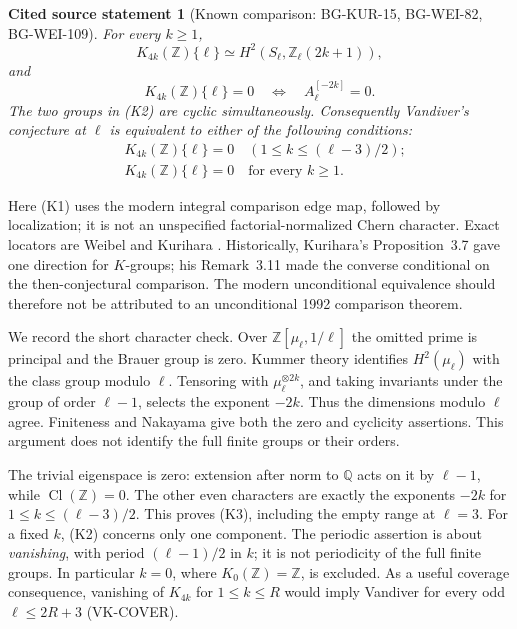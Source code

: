 \documentclass[11pt,a4paper]{article}
\newtheorem{sourcefact}[theorem]{Cited source statement}
\theoremstyle{definition}
\begin{document}
\begin{sourcefact}[Known comparison: BG-KUR-15, BG-WEI-82, BG-WEI-109]
For every \(k\ge1\),
\[
 K_{4k}(\mathbb Z)\{\ell\}
 \simeq H^2(S_\ell,\mathbb Z_\ell(2k+1)),                 \tag{K1}
\]
and
\[
 K_{4k}(\mathbb Z)\{\ell\}=0
 \quad\Longleftrightarrow\quad A_\ell^{[-2k]}=0.         \tag{K2}
\]
The two groups in (K2) are cyclic simultaneously.
Consequently Vandiver's conjecture at \(\ell\) is equivalent to either
of the following conditions:
\[
\begin{split}
 &K_{4k}(\mathbb Z)\{\ell\}=0
       \quad(1\le k\le(\ell-3)/2);\\
 &K_{4k}(\mathbb Z)\{\ell\}=0
       \quad\text{for every }k\ge1.
\end{split}
\tag{K3}
\]
\end{sourcefact}

Here (K1) uses the modern integral comparison edge map, followed by
localization; it is not an unspecified factorial-normalized Chern
character. Exact locators are Weibel \cite[VI.8.2, VI.8.3,
VI.10.9]{Weibel2013} and Kurihara
\cite[Lemma~1.2, Corollary~1.5, Proposition~3.7, Remark~3.11]{Kurihara1992}.
Historically, Kurihara's Proposition~3.7 gave one direction for
\(K\)-groups; his Remark~3.11 made the converse conditional on the
then-conjectural comparison. The modern unconditional equivalence
should therefore not be attributed to an unconditional 1992
comparison theorem.

We record the short character check. Over
\(\mathbb Z[\mu_\ell,1/\ell]\) the omitted prime is principal and the
Brauer group is zero. Kummer theory identifies \(H^2(\mu_\ell)\)
with the class group modulo \(\ell\). Tensoring with
\(\mu_\ell^{\otimes2k}\), and taking invariants under the group of
order \(\ell-1\), selects the exponent \(-2k\). Thus the dimensions
modulo \(\ell\) agree. Finiteness and Nakayama give both the zero
and cyclicity assertions. This argument does not identify the full
finite groups or their orders.

The trivial eigenspace is zero: extension after norm to
\(\mathbb Q\) acts on it by \(\ell-1\), while
\(\operatorname{Cl}(\mathbb Z)=0\). The other even characters are
exactly the exponents \(-2k\) for
\(1\le k\le(\ell-3)/2\). This proves (K3), including the empty range
at \(\ell=3\). For a fixed \(k\), (K2) concerns only one component.
The periodic assertion is about \emph{vanishing}, with period
\((\ell-1)/2\) in \(k\); it is not periodicity of the full finite
groups. In particular \(k=0\), where \(K_0(\mathbb Z)=\mathbb Z\),
is excluded. As a useful coverage consequence, vanishing of
\(K_{4k}\) for \(1\le k\le R\) would imply Vandiver for
every odd \(\ell\le2R+3\) (VK-COVER).
\end{document}
